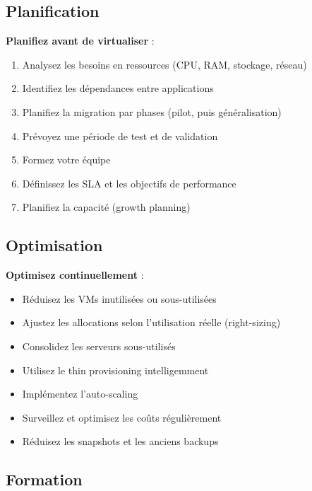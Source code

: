 \documentclass[11pt,a4paper]{article}
\begin{document}
\subsection{Planification}

\begin{tipbox}
\textbf{Planifiez avant de virtualiser} :
\begin{enumerate}
    \item Analysez les besoins en ressources (CPU, RAM, stockage, réseau)
    \item Identifiez les dépendances entre applications
    \item Planifiez la migration par phases (pilot, puis généralisation)
    \item Prévoyez une période de test et de validation
    \item Formez votre équipe
    \item Définissez les SLA et les objectifs de performance
    \item Planifiez la capacité (growth planning)
\end{enumerate}
\end{tipbox}

\subsection{Optimisation}

\begin{tipbox}
\textbf{Optimisez continuellement} :
\begin{itemize}
    \item Réduisez les VMs inutilisées ou sous-utilisées
    \item Ajustez les allocations selon l'utilisation réelle (right-sizing)
    \item Consolidez les serveurs sous-utilisés
    \item Utilisez le thin provisioning intelligemment
    \item Implémentez l'auto-scaling
    \item Surveillez et optimisez les coûts régulièrement
    \item Réduisez les snapshots et les anciens backups
\end{itemize}
\end{tipbox}

\subsection{Formation}
\end{document}
